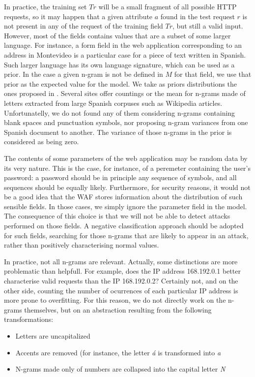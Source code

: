 \documentclass[runningheads,a4paper]{llncs}
\begin{document}
In practice, the training set $Tr$ will be a small fragment of all possible HTTP requests, so it may happen that a given attribute $a$ found in the test request $r$ is not present in any of the request of the training field $Tr$, but still a valid input. However, most of the fields contains values that are a subset of some larger language. For instance, a form field in the web application corresponding to an address in Montevideo is a particular case for a piece of text written in Spanish. Such larger language has its own language signature, which can be used as a prior. In the case a given n-gram is not be defined in $M$ for that field, we use that prior as the expected value for the model. We take as priors distributions the ones proposed in \cite{priors}. Several sites offer countings or the mean for n-grams made of letters extracted from large Spanish corpuses such as Wikipedia articles. Unfortunatelly, we do not found any of them considering n-grams containing blank spaces and punctuation symbols, nor proposing n-gram variances from one Spanish document to another. The variance of those n-grams in the prior is considered as being zero.

The contents of some parameters of the web application may be random data by its very nature. This is the case, for instance, of a peremeter containing the user's password: a password should be in principle any sequence of symbols, and all sequences should be equally likely. Furthermore, for security reasons, it would not be a good idea that the WAF stores information about the distribution of such sensible fields. In those cases, we simply ignore the parameter field in the model. The consequence of this choice is that we will not be able to detect attacks performed on those fields. A negative classification approach should be adopted for such fields, searching for those n-grams that are likely to appear in an attack, rather than positively characterising normal values. 

In practice, not all n-grams are relevant. Actually, some distinctions are more problematic than helpfull. For example, does the IP address 168.192.0.1 better characterise valid requests than the IP 168.192.0.2? Certainly not, and on the other side, counting the number of ocurrences of each particular IP address is more prone to overfitting. For this reason, we do not directly work on the n-grams themselves, but on an abstraction resulting from the following transformations: 
\begin{itemize}
\item Letters are uncapitalized
\item Accents are removed (for instance, the letter \textit{á} is transformed into \textit{a}
\item N-grams made only of numbers are collapsed into the capital letter \textit{N}
\end{itemize}
\end{document}
